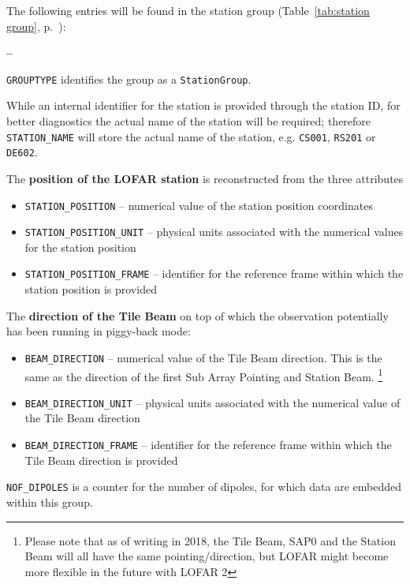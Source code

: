 \documentclass[a4paper,10pt,bibtotoc]{scrartcl}
\begin{document}
The following entries will be found in the station group (Table~\ref{tab:station group}, p.~\pageref{tab:station group}):
\begin{list}{\textbf{--}}{}
\item \verb|GROUPTYPE| identifies the group as a \verb|StationGroup|.
\item While an internal identifier for the station is provided
  through the station ID, for better diagnostics the actual name of
  the station will be required; therefore \verb|STATION_NAME| will
  store the actual name of the station, e.g. \texttt{CS001},
  \texttt{RS201} or \texttt{DE602}.
\item The \textbf{position of the LOFAR station} is reconstructed from the three
  attributes
  \begin{itemize} \parskip 0pt
  \item \verb|STATION_POSITION| -- numerical value of the station position
    coordinates
  \item \verb|STATION_POSITION_UNIT| -- physical units associated with the numerical
    values for the station position
  \item \verb|STATION_POSITION_FRAME| -- identifier for the reference frame within
    which the station position is provided
  \end{itemize}
\item The \textbf{direction of the Tile Beam} on top of which the observation
  potentially has been running in piggy-back mode:
  \begin{itemize} \parskip 0pt
  \item \verb|BEAM_DIRECTION| -- numerical value of the Tile Beam
    direction. This is the same as the direction of the first Sub Array Pointing and Station Beam. \footnote{Please note that as of writing in 2018, the Tile Beam, SAP0 and the Station Beam will all have the same pointing/direction, but LOFAR might become more flexible in the future with LOFAR 2}
  \item \verb|BEAM_DIRECTION_UNIT| -- physical units associated with the numerical
    value of the Tile Beam direction
  \item \verb|BEAM_DIRECTION_FRAME| -- identifier for the reference frame within
    which the Tile Beam direction is provided
  \end{itemize}
\item \verb|NOF_DIPOLES| is a counter for the number of dipoles, for which data
  are embedded within this group.
\end{list}
\end{document}
